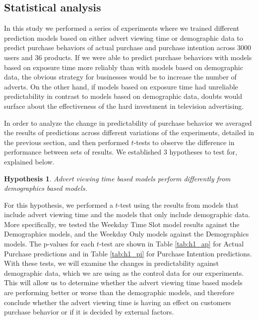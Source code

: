 \documentclass[review]{elsarticle}
\newtheorem{hyp}{Hypothesis}
\begin{document}
\subsection{Statistical analysis}
\label{h_res}


In this study we performed a series of experiments where we trained different prediction models based on either advert viewing time or demographic data to predict purchase behaviors of actual purchase and purchase intention across 3000 users and 36 products. If we were able to predict purchase behaviors with models based on exposure time more reliably than with models based on demographic data, the obvious strategy for businesses would be to increase the number of adverts. On the other hand, if models based on exposure time had unreliable predictability in contrast to models based on demographic data, doubts would surface about the effectiveness of the hard investment in television advertising. 

In order to analyze the change in predictability of purchase behavior we averaged the results of predictions across different variations of the experiments, detailed in the previous section, and then performed \(t\)-tests to observe the difference in performance between sets of results. We established 3 hypotheses to test for, explained below.

\begin{hyp}
\label{hyp:1}
Advert viewing time based models perform differently from demographics based models.
\end{hyp}

For this hypothesis, we performed a \(t\)-test using the results from models that include advert viewing time and the models that only include demographic data. More specifically, we tested the Weekday Time Slot model results against the Demographics models, and the Weekday Only models against the Demographics models. The p-values for each \(t\)-test are shown in Table \ref{tab:h1_ap} for Actual Purchase predictions and in Table \ref{tab:h1_pi} for Purchase Intention predictions. With these tests, we will examine the changes in predictability against demographic data, which we are using as the control data for our experiments. This will allow us to determine whether the advert viewing time based models are performing better or worse than the demographic models, and therefore conclude whether the advert viewing time is having an effect on customers purchase behavior or if it is decided by external factors.
\end{document}
